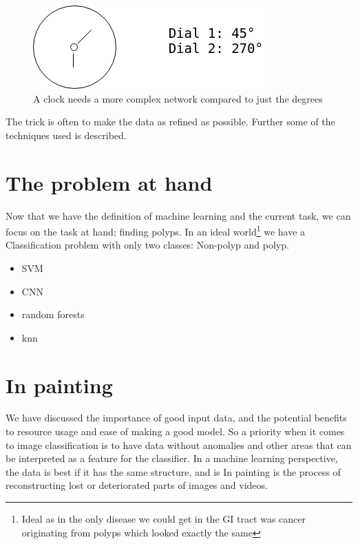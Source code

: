 	\begin{figure}[ht]
	  \centering
	  \includegraphics[scale=0.5]{methods/figures/Clock.png}
	  \caption{A clock needs a more complex network compared to just the degrees}
	\end{figure}
	The trick is often to make the data as refined as possible. 
	Further some of the techniques used is described.
	
	
	
	  
	  
\section{The problem at hand}
	  Now that we have the definition of machine learning and the current task, we can focus on the task at hand; finding polyps. In an ideal world\footnote{Ideal as in the only disease we could get in  the GI tract was cancer originating
	  from polyps which looked exactly the same} we have a
	  Classification problem with only two classes: Non-polyp and polyp. 
	  
	  \begin{itemize}
	    \item SVM 
	    \item CNN 
	    \item random forests
	    \item knn
	  \end{itemize}

\iffalse
\section{In painting}
  We have discussed the importance of good input data, and the potential benefits to resource usage and ease of making a good model.
  So a priority when it comes to image classification is to have data without anomalies and other areas that can be interpreted as a feature for the classifier. 
  In a machine learning perspective, the data is best if it has the same structure, and is %
  In painting is the process of reconstructing lost or deteriorated parts of images and videos. %
  

